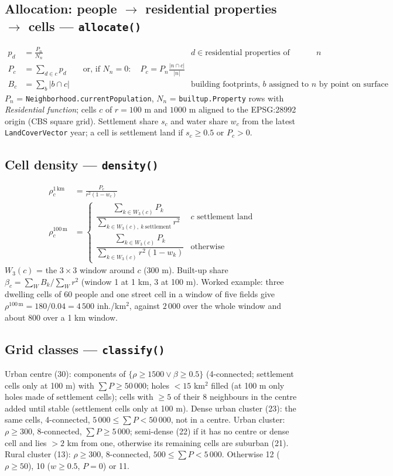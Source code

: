 \documentclass[11pt]{article}
\newcommand{\code}[1]{\texttt{#1}}
\begin{document}
\subsection{Allocation: people $\rightarrow$ residential properties $\rightarrow$ cells --- \code{allocate()}}
\begin{align}
  p_d &= \frac{P_n}{N_n} && d \in \text{residential properties of neighbourhood } n \\
  P_c &= \sum_{d \in c} p_d \qquad\text{or, if } N_n = 0:\quad P_c = P_n \frac{|n \cap c|}{|n|} \\
  B_c &= \sum_{b} |b \cap c| && \text{building footprints, } b \text{ assigned to } n \text{ by point on surface}
\end{align}
$P_n$ = \code{Neighborhood.currentPopulation}, $N_n$ = \code{builtup.Property} rows with \emph{Residential function}; cells $c$ of $r = 100$ m and $1000$ m aligned to the EPSG:28992 origin (CBS square grid). Settlement share $s_c$ and water share $w_c$ from the latest \code{LandCoverVector} year; a cell is settlement land if $s_c \ge 0.5$ or $P_c > 0$.

\subsection{Cell density --- \code{density()}}
\begin{align}
  \rho^{1\,\text{km}}_c &= \frac{P_c}{r^2 (1 - w_c)} \\
  \rho^{100\,\text{m}}_c &= \begin{cases}
    \dfrac{\sum_{k \in W_3(c)} P_k}{\sum_{k \in W_3(c),\ k\ \text{settlement}} r^2} & c \text{ settlement land} \\[2ex]
    \dfrac{\sum_{k \in W_3(c)} P_k}{\sum_{k \in W_3(c)} r^2 (1 - w_k)} & \text{otherwise}
  \end{cases}
\end{align}
$W_3(c)$ = the $3 \times 3$ window around $c$ (300 m). Built-up share $\beta_c = \sum_{W} B_k / \sum_{W} r^2$ (window 1 at 1 km, 3 at 100 m). Worked example: three dwelling cells of 60 people and one street cell in a window of five fields give $\rho^{100\,\text{m}} = 180 / 0.04 = 4\,500$ inh./km$^2$, against $2\,000$ over the whole window and about $800$ over a 1 km window.

\subsection{Grid classes --- \code{classify()}}
Urban centre (30): components of $\{\rho \ge 1500 \lor \beta \ge 0.5\}$ (4-connected; settlement cells only at 100 m) with $\sum P \ge 50\,000$; holes $< 15$ km$^2$ filled (at 100 m only holes made of settlement cells); cells with $\ge 5$ of their 8 neighbours in the centre added until stable (settlement cells only at 100 m). Dense urban cluster (23): the same cells, 4-connected, $5\,000 \le \sum P < 50\,000$, not in a centre. Urban cluster: $\rho \ge 300$, 8-connected, $\sum P \ge 5\,000$; semi-dense (22) if it has no centre or dense cell and lies $> 2$ km from one, otherwise its remaining cells are suburban (21). Rural cluster (13): $\rho \ge 300$, 8-connected, $500 \le \sum P < 5\,000$. Otherwise 12 ($\rho \ge 50$), 10 ($w \ge 0.5$, $P = 0$) or 11.
\end{document}
